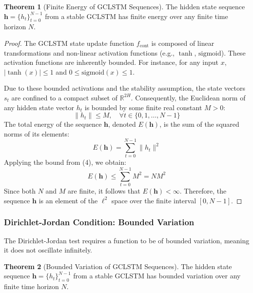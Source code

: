 \documentclass{article}
\theoremstyle{remark}
\theoremstyle{definition}
\newtheorem{theorem}{Theorem}[section]
\begin{document}
\begin{theorem}[Finite Energy of GCLSTM Sequences]
The hidden state sequence $\mathbf{h} = \{h_t\}_{t=0}^{N-1}$ from a stable GCLSTM has finite energy over any finite time horizon $N$.
\end{theorem}

\begin{proof}
The GCLSTM state update function $f_{\text{cont}}$ is composed of linear transformations and non-linear activation functions (e.g., $\tanh$, $\text{sigmoid}$). These activation functions are inherently bounded. For instance, for any input $x$, $|\tanh(x)| \le 1$ and $0 \le \text{sigmoid}(x) \le 1$.

Due to these bounded activations and the stability assumption, the state vectors $s_t$ are confined to a compact subset of $\mathbb{R}^{2H}$. Consequently, the Euclidean norm of any hidden state vector $h_t$ is bounded by some finite real constant $M > 0$:
\begin{equation}
    \|h_t\| \le M, \quad \forall t \in \{0, 1, \dots, N-1\}
\end{equation}
The total energy of the sequence $\mathbf{h}$, denoted $E(\mathbf{h})$, is the sum of the squared norms of its elements:
\begin{equation}
    E(\mathbf{h}) = \sum_{t=0}^{N-1} \|h_t\|^2
\end{equation}
Applying the bound from (4), we obtain:
\begin{equation}
    E(\mathbf{h}) \le \sum_{t=0}^{N-1} M^2 = N M^2
\end{equation}
Since both $N$ and $M$ are finite, it follows that $E(\mathbf{h}) < \infty$. Therefore, the sequence $\mathbf{h}$ is an element of the $\ell^2$ space over the finite interval $[0, N-1]$.
\end{proof}


\subsubsection{Dirichlet-Jordan Condition: Bounded Variation}
The Dirichlet-Jordan test requires a function to be of bounded variation, meaning it does not oscillate infinitely.

\begin{theorem}[Bounded Variation of GCLSTM Sequences]
The hidden state sequence $\mathbf{h} = \{h_t\}_{t=0}^{N-1}$ from a stable GCLSTM has bounded variation over any finite time horizon $N$.
\end{theorem}
\end{document}
